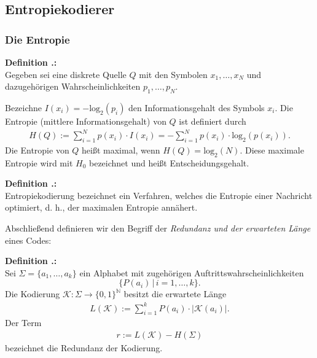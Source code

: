 \documentclass[a4paper,12pt]{article}
\newcommand{\N}{\mathbb N}
\newcounter{Definition}
\newenvironment{Definition}{
\bigskip
        
        \setlength{\parindent}{0pt}
        \addtocounter{Definition}{1}
        \textbf{\textsf{Definition \thesubsection.\theDefinition}:}\\}{
        \nopagebreak
        \vspace{-1.0ex}
        \bigskip
        
}
\begin{document}
\subsection{Entropiekodierer}
\subsubsection{Die Entropie}
\begin{Definition}
Gegeben sei eine diskrete Quelle $Q$ mit den Symbolen $x_{1},\ldots,x_{N}$ und dazugehörigen Wahrscheinlichkeiten $p_1,\ldots,p_N$.
\par
Bezeichne $I(x_{i}) = -\text{log}_{2}(p_{i})$ den Informationsgehalt des Symbols $x_{i}$.
Die Entropie (mittlere Informationsgehalt) von $Q$ ist definiert durch
\begin{align*}
H(Q):=\sum_{i=1}^N p(x_{i})\cdot I(x_{i}) =- \sum_{i=1}^N p(x_{i}) \cdot \text{log}_2(p(x_{i})).
\end{align*}
Die Entropie von $Q$ heißt maximal, wenn $H(Q) = \text{log}_2(N)$.
 Diese maximale Entropie wird mit $H_{0}$ bezeichnet und heißt Entscheidungsgehalt.
\end{Definition}
\begin{Definition}
Entropiekodierung bezeichnet ein Verfahren, welches die Entropie einer Nachricht optimiert, d. h., der maximalen Entropie annähert.
\end{Definition}
Abschließend definieren wir den Begriff der  {\it Redundanz und der erwarteten Länge} eines Codes:
\begin{Definition}
Sei $\Sigma = \{a_{1},\ldots, a_{k}\}$ ein Alphabet mit zugehörigen Auftrittswahrscheinlichkeiten 
$$
\{P(a_{i})\,|\,i=1,\ldots,k\}.
$$
Die Kodierung $\mathcal{K}: \Sigma\rightarrow \{0, 1\}^{\N}$ besitzt die erwartete Länge
\begin{align*}
L(\mathcal{K}):=\sum_{i=1}^{k} P(a_{i})\cdot \left| \mathcal{K}(a_{i})\right|.
\end{align*}
Der Term 
\begin{align*}
r:=L(\mathcal{K}) - H(\Sigma)
\end{align*}
bezeichnet die Redundanz der Kodierung.
\end{Definition}
\end{document}
